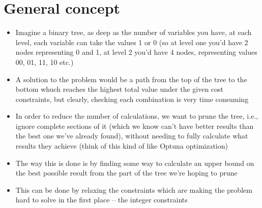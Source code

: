 \documentclass[10pt]{article}
\begin{document}
\section{General concept}
\begin{itemize}
    \item Imagine a binary tree, as deep as the number of variables you have, at each level, each variable can take the values 1 or 0 (so at level one you'd have 2 nodes representing 0 and 1, at level 2 you'd have 4 nodes, representing values 00, 01, 11, 10 etc.)
    \item A solution to the problem would be a path from the top of the tree to the bottom whuch reaches the highest total value under the given cost constraints, but clearly, checking each combination is very time consuming
    \item In order to reduce the number of calculations, we want to prune the tree, i.e., ignore complete sections of it (which we know can't have better results than the best one we've already found), without needing to fully calculate what results they achieve (think of this kind of like Optuna optimization)
    \item The way this is done is by finding some way to calculate an upper bound on the best possible result from the part of the tree we're hoping to prune 
    \item This can be done by relaxing the constraints which are making the problem hard to solve in the first place -- the integer constraints 
\end{itemize}
\newpage 
\end{document}
